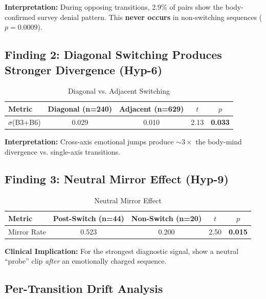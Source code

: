 \documentclass[11pt, a4paper]{report}
\begin{document}
\textbf{Interpretation:} During opposing transitions, 2.9\% of pairs show the body-confirmed survey denial pattern. This \textbf{never occurs} in non-switching sequences ($p = 0.0009$).


\subsection{Finding 2: Diagonal Switching Produces Stronger Divergence (Hyp-6)}

\begin{table}[H]
    \centering
    \small
    \caption{Diagonal vs. Adjacent Switching}
    \label{tab:hyp6}
    \begin{tabular}{@{}lcccc@{}}
        \toprule
        \textbf{Metric} & \textbf{Diagonal (n=240)} & \textbf{Adjacent (n=629)} & \textbf{$t$} & \textbf{$p$} \\
        \midrule
        $\sigma$(B3+B6) & 0.029 & 0.010 & 2.13 & \textbf{0.033} \\
        \bottomrule
    \end{tabular}
\end{table}

\textbf{Interpretation:} Cross-axis emotional jumps produce $\sim$$3\times$ the body-mind divergence vs. single-axis transitions.


\subsection{Finding 3: Neutral Mirror Effect (Hyp-9)}

\begin{table}[H]
    \centering
    \small
    \caption{Neutral Mirror Effect}
    \label{tab:hyp9}
    \begin{tabular}{@{}lcccc@{}}
        \toprule
        \textbf{Metric} & \textbf{Post-Switch (n=44)} & \textbf{Non-Switch (n=20)} & \textbf{$t$} & \textbf{$p$} \\
        \midrule
        Mirror Rate & 0.523 & 0.200 & 2.50 & \textbf{0.015} \\
        \bottomrule
    \end{tabular}
\end{table}

\textbf{Clinical Implication:} For the strongest diagnostic signal, show a neutral ``probe'' clip \textit{after} an emotionally charged sequence.


\subsection{Per-Transition Drift Analysis}
\label{sec:results-drift-transitions}
\end{document}
